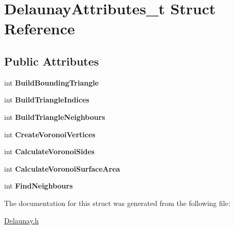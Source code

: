 \hypertarget{structDelaunayAttributes__t}{
\section{DelaunayAttributes\_\-t Struct Reference}
\label{structDelaunayAttributes__t}
}
\subsection*{Public Attributes}
\begin{DoxyCompactItemize}
\item 
\hypertarget{structDelaunayAttributes__t_a26fdb61d59920edc1dd0018b44f322e2}{
int {\bfseries BuildBoundingTriangle}}
\label{structDelaunayAttributes__t_a26fdb61d59920edc1dd0018b44f322e2}

\item 
\hypertarget{structDelaunayAttributes__t_ad8cfb5b545a95a232e1ad033592e5356}{
int {\bfseries BuildTriangleIndices}}
\label{structDelaunayAttributes__t_ad8cfb5b545a95a232e1ad033592e5356}

\item 
\hypertarget{structDelaunayAttributes__t_ae3664ae0ff528ecad8540643a67f2c08}{
int {\bfseries BuildTriangleNeighbours}}
\label{structDelaunayAttributes__t_ae3664ae0ff528ecad8540643a67f2c08}

\item 
\hypertarget{structDelaunayAttributes__t_aece2e9ef908953bedd7c70ac23697d87}{
int {\bfseries CreateVoronoiVertices}}
\label{structDelaunayAttributes__t_aece2e9ef908953bedd7c70ac23697d87}

\item 
\hypertarget{structDelaunayAttributes__t_aa4c9007b6b0bf7121fd48f4a1edce566}{
int {\bfseries CalculateVoronoiSides}}
\label{structDelaunayAttributes__t_aa4c9007b6b0bf7121fd48f4a1edce566}

\item 
\hypertarget{structDelaunayAttributes__t_a07764323a64ba8a6f5f73fbb74ce8e06}{
int {\bfseries CalculateVoronoiSurfaceArea}}
\label{structDelaunayAttributes__t_a07764323a64ba8a6f5f73fbb74ce8e06}

\item 
\hypertarget{structDelaunayAttributes__t_ace85f1061f01a04cb0779a213d31251a}{
int {\bfseries FindNeighbours}}
\label{structDelaunayAttributes__t_ace85f1061f01a04cb0779a213d31251a}

\end{DoxyCompactItemize}


The documentation for this struct was generated from the following file:\begin{DoxyCompactItemize}
\item 
\hyperlink{Delaunay_8h}{Delaunay.h}\end{DoxyCompactItemize}
